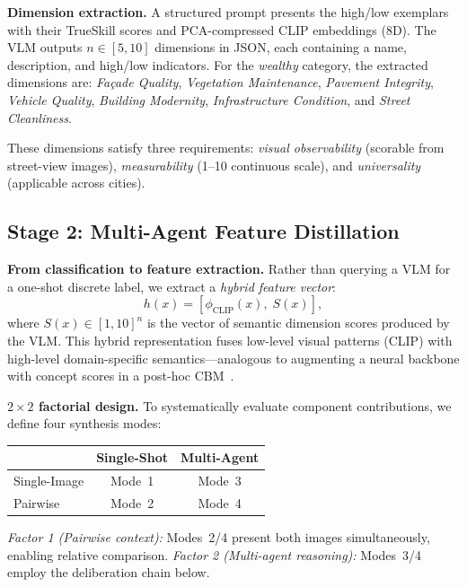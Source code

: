 \documentclass[runningheads]{llncs}
\begin{document}
\smallskip\noindent\textbf{Dimension extraction.}
A structured prompt presents the high/low exemplars with their TrueSkill scores and PCA-compressed CLIP embeddings (8D).
The VLM outputs $n\in[5,10]$ dimensions in JSON, each containing a name, description, and high/low indicators.
For the \emph{wealthy} category, the extracted dimensions are:
\emph{Fa\c{c}ade Quality}, \emph{Vegetation Maintenance}, \emph{Pavement Integrity}, \emph{Vehicle Quality}, \emph{Building Modernity}, \emph{Infrastructure Condition}, and \emph{Street Cleanliness}.

These dimensions satisfy three requirements: \emph{visual observability} (scorable from street-view images), \emph{measurability} (1--10 continuous scale), and \emph{universality} (applicable across cities).

\subsection{Stage 2: Multi-Agent Feature Distillation}
\label{sec:stage2}

\noindent\textbf{From classification to feature extraction.}
Rather than querying a VLM for a one-shot discrete label, we extract a \emph{hybrid feature vector}:
\begin{equation}
h(x) = [\phi_{\text{CLIP}}(x),\; S(x)],
\label{eq:hybrid}
\end{equation}
where $S(x)\in[1,10]^{n}$ is the vector of semantic dimension scores produced by the VLM.
This hybrid representation fuses low-level visual patterns (CLIP) with high-level domain-specific semantics---analogous to augmenting a neural backbone with concept scores in a post-hoc CBM~\cite{yuksekgonul2023posthoc}.

\smallskip\noindent\textbf{$2{\times}2$ factorial design.}
To systematically evaluate component contributions, we define four synthesis modes:
\begin{center}
\small
\begin{tabular}{l|cc}
\toprule
 & Single-Shot & Multi-Agent \\
\midrule
Single-Image & Mode~1 & Mode~3 \\
Pairwise     & Mode~2 & Mode~4 \\
\bottomrule
\end{tabular}
\end{center}
\emph{Factor 1 (Pairwise context):} Modes~2/4 present both images simultaneously, enabling relative comparison.
\emph{Factor 2 (Multi-agent reasoning):} Modes~3/4 employ the deliberation chain below.
\end{document}
